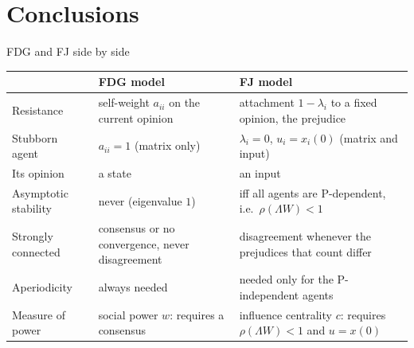 \documentclass[10pt, aspectratio=169]{beamer}
\begin{document}
\section{Conclusions}

\begin{frame}[label=m-table]{FDG and FJ side by side}
  \centering
  \footnotesize
  \renewcommand{\arraystretch}{1.2}
  \begin{tabular}{@{}>{\raggedright\arraybackslash}p{2.9cm}
                  >{\raggedright\arraybackslash}p{4.9cm}
                  >{\raggedright\arraybackslash}p{5.2cm}@{}}
    \toprule
    & FDG model & FJ model \\
    \midrule
    Resistance & self-weight $a_{ii}$ on the current opinion & attachment $1 - \lambda_i$ to a
                                                               fixed opinion, the prejudice \\
    Stubborn agent & $a_{ii} = 1$ (matrix only) & $\lambda_i = 0$, $u_i = x_i(0)$ (matrix
                                                   and input) \\
    Its opinion & a state & an input \\
    Asymptotic stability & never (eigenvalue $1$) & iff all agents are P-dependent,
                                                      i.e.\ $\rho(\Lambda W) < 1$ \\
    Strongly connected & consensus or no convergence, never disagreement
                       & disagreement whenever the prejudices that count differ \\
    Aperiodicity & always needed & needed only for the P-independent agents \\
    Measure of power & social power $w$: requires a consensus
                     & influence centrality $c$: requires $\rho(\Lambda W) < 1$ and
                       $u = x(0)$ \\
    \bottomrule
  \end{tabular}


\end{frame}
\end{document}
